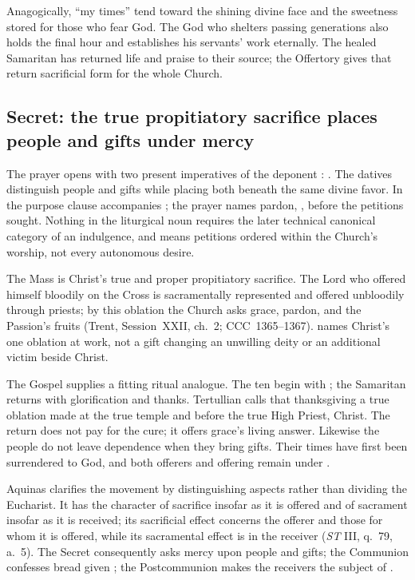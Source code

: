 Anagogically, ``my times'' tend toward the shining divine face and the sweetness
stored for those who fear God. The God who shelters passing generations also
holds the final hour and establishes his servants' work eternally. The healed
Samaritan has returned life and praise to their source; the Offertory gives that
return sacrificial form for the whole Church.

\subsection*{Secret: the true propitiatory sacrifice places people and gifts under mercy\enspace{}}

The prayer opens with two present imperatives of the deponent :
. The datives distinguish
people and gifts while placing both beneath the same divine favor. In the
purpose clause  accompanies ; the prayer
names pardon, , before the petitions sought. Nothing in the
liturgical noun requires the later technical canonical category of an
indulgence, and  means petitions ordered within the Church's
worship, not every autonomous desire.

The Mass is Christ's true and proper propitiatory sacrifice. The Lord who
offered himself bloodily on the Cross is sacramentally represented and offered
unbloodily through priests; by this oblation the Church asks grace, pardon, and
the Passion's fruits (Trent, Session~XXII, ch.~2; CCC~1365--1367).
 names Christ's one oblation at work, not a gift changing an
unwilling deity or an additional victim beside Christ.

The Gospel supplies a fitting ritual analogue. The ten begin with
; the Samaritan returns with glorification and thanks.
Tertullian calls that thanksgiving a true oblation made at the true temple and
before the true High Priest, Christ. The return does not pay for the cure; it
offers grace's living answer. Likewise the people do not leave dependence when
they bring gifts. Their times have first been surrendered to God, and both
offerers and offering remain under .

Aquinas clarifies the movement by distinguishing aspects rather than dividing
the Eucharist. It has the character of sacrifice insofar as it is offered and
of sacrament insofar as it is received; its sacrificial effect concerns the
offerer and those for whom it is offered, while its sacramental effect is in
the receiver (\emph{ST} III, q.~79, a.~5). The Secret consequently asks mercy
upon people and gifts; the Communion confesses bread given ; the
Postcommunion makes the receivers the subject of .

